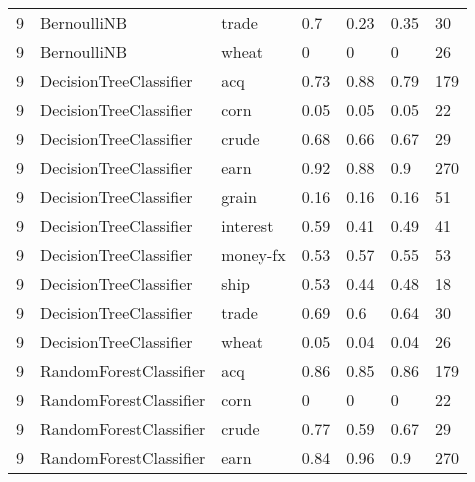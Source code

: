 \documentclass{article}
\begin{document}
\begin{table}[h]
\begin{tabular}{lllllll}
9             & BernoulliNB            & trade           & 0.7                & 0.23            & 0.35              & 30               \\
9             & BernoulliNB            & wheat           & 0                  & 0               & 0                 & 26               \\
9             & DecisionTreeClassifier & acq             & 0.73               & 0.88            & 0.79              & 179              \\
9             & DecisionTreeClassifier & corn            & 0.05               & 0.05            & 0.05              & 22               \\
9             & DecisionTreeClassifier & crude           & 0.68               & 0.66            & 0.67              & 29               \\
9             & DecisionTreeClassifier & earn            & 0.92               & 0.88            & 0.9               & 270              \\
9             & DecisionTreeClassifier & grain           & 0.16               & 0.16            & 0.16              & 51               \\
9             & DecisionTreeClassifier & interest        & 0.59               & 0.41            & 0.49              & 41               \\
9             & DecisionTreeClassifier & money-fx        & 0.53               & 0.57            & 0.55              & 53               \\
9             & DecisionTreeClassifier & ship            & 0.53               & 0.44            & 0.48              & 18               \\
9             & DecisionTreeClassifier & trade           & 0.69               & 0.6             & 0.64              & 30               \\
9             & DecisionTreeClassifier & wheat           & 0.05               & 0.04            & 0.04              & 26               \\
9             & RandomForestClassifier & acq             & 0.86               & 0.85            & 0.86              & 179              \\
9             & RandomForestClassifier & corn            & 0                  & 0               & 0                 & 22               \\
9             & RandomForestClassifier & crude           & 0.77               & 0.59            & 0.67              & 29               \\
9             & RandomForestClassifier & earn            & 0.84               & 0.96            & 0.9               & 270              \\\end{tabular}
\end{table}
\end{document}
